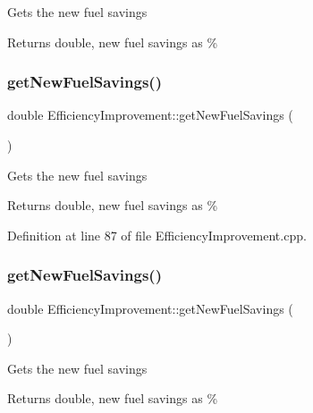 Gets the new fuel savings

\begin{DoxyReturn}{Returns}
double, new fuel savings as \% 
\end{DoxyReturn}
\mbox{\label{class_efficiency_improvement_a1b85007b7b046b998443f5eb267822f9}} 
\subsubsection{\texorpdfstring{get\+New\+Fuel\+Savings()}{getNewFuelSavings()}\hspace{0.1cm}{\footnotesize\ttfamily [2/3]}}
{\footnotesize\ttfamily double Efficiency\+Improvement\+::get\+New\+Fuel\+Savings (\begin{DoxyParamCaption}{ }\end{DoxyParamCaption})}

Gets the new fuel savings

\begin{DoxyReturn}{Returns}
double, new fuel savings as \% 
\end{DoxyReturn}


Definition at line 87 of file Efficiency\+Improvement.\+cpp.

\mbox{\label{class_efficiency_improvement_a1b85007b7b046b998443f5eb267822f9}} 
\subsubsection{\texorpdfstring{get\+New\+Fuel\+Savings()}{getNewFuelSavings()}\hspace{0.1cm}{\footnotesize\ttfamily [3/3]}}
{\footnotesize\ttfamily double Efficiency\+Improvement\+::get\+New\+Fuel\+Savings (\begin{DoxyParamCaption}{ }\end{DoxyParamCaption})}

Gets the new fuel savings

\begin{DoxyReturn}{Returns}
double, new fuel savings as \% 
\end{DoxyReturn}
\mbox{\label{class_efficiency_improvement_a89e8480c7d2477ee249e847d4669ee2e}} 

